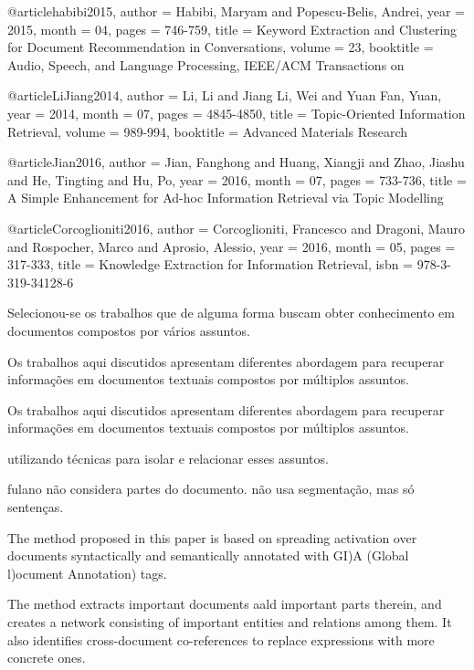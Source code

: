 @article{habibi2015,
author = {Habibi, Maryam and Popescu-Belis, Andrei},
year = {2015},
month = {04},
pages = {746-759},
title = {Keyword Extraction and Clustering for Document Recommendation in Conversations},
volume = {23},
booktitle = {Audio, Speech, and Language Processing, IEEE/ACM Transactions on}
}



@article{LiJiang2014,
author = {Li, Li and Jiang Li, Wei and Yuan Fan, Yuan},
year = {2014},
month = {07},
pages = {4845-4850},
title = {Topic-Oriented Information Retrieval},
volume = {989-994},
booktitle = {Advanced Materials Research}
}


@article{Jian2016,
author = {Jian, Fanghong and Huang, Xiangji and Zhao, Jiashu and He, Tingting and Hu, Po},
year = {2016},
month = {07},
pages = {733-736},
title = {A Simple Enhancement for Ad-hoc Information Retrieval via Topic Modelling}
}


@article{Corcoglioniti2016,
author = {Corcoglioniti, Francesco and Dragoni, Mauro and Rospocher, Marco and Aprosio, Alessio},
year = {2016},
month = {05},
pages = {317-333},
title = {Knowledge Extraction for Information Retrieval},
isbn = {978-3-319-34128-6}
}








Selecionou-se os trabalhos que de alguma forma buscam obter conhecimento em documentos compostos por vários assuntos.  

Os trabalhos aqui discutidos apresentam diferentes abordagem para recuperar informações em   documentos textuais compostos por múltiplos assuntos.  

Os trabalhos aqui discutidos apresentam diferentes abordagem para recuperar informações em documentos textuais compostos por múltiplos assuntos.




utilizando técnicas para isolar e relacionar esses assuntos.




fulano não considera partes do documento. 
não usa segmentação, mas só sentenças.



The method proposed in this paper is
based on spreading activation over documents
syntactically and semantically annotated with
GI)A (Global l)ocument Annotation) tags.
 
The method extracts important documents aald 
important parts therein, and creates a network
consisting of important entities and relations
among them. It also identifies cross-document
co-references to replace expressions with more
concrete ones.



